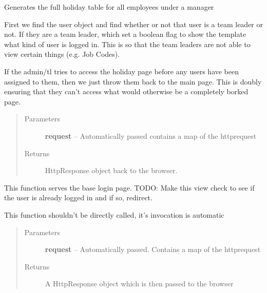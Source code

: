 \documentclass[letterpaper,10pt,english]{sphinxmanual}
\begin{document}

\begin{fulllineitems}
\label{code:timetracker.views.holiday_planning}
Generates the full holiday table for all employees under a manager

First we find the user object and find whether or not that user is a team
leader or not. If they are a team leader, which set a boolean flag to show
the template what kind of user is logged in. This is so that the team
leaders are not able to view certain things (e.g. Job Codes).

If the admin/tl tries to access the holiday page before any users have
been assigned to them, then we just throw them back to the main page. This
is doubly ensuring that they can't access what would otherwise be a
completely borked page.
\begin{quote}\begin{description}
\item[{Parameters}] \leavevmode
\textbf{request} -- Automatically passed contains a map of the httprequest

\item[{Returns}] \leavevmode
HttpResponse object back to the browser.

\end{description}\end{quote}

\end{fulllineitems}


\begin{fulllineitems}
\label{code:timetracker.views.index}
This function serves the base login page. TODO: Make this view check
to see if the user is already logged in and if so, redirect.

This function shouldn't be directly called, it's invocation is automatic
\begin{quote}\begin{description}
\item[{Parameters}] \leavevmode
\textbf{request} -- Automatically passed. Contains a map of the httprequest

\item[{Returns}] \leavevmode
A HttpResponse object which is then passed to the browser

\end{description}\end{quote}

\end{fulllineitems}
\end{document}
